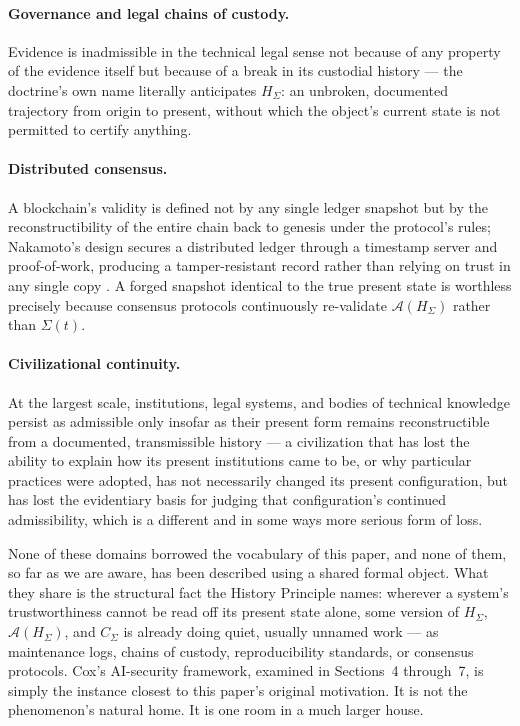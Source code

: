 \documentclass[11pt]{article}
\begin{document}
\paragraph{Governance and legal chains of custody.} Evidence is inadmissible in the technical legal sense not because of any property of the evidence itself but because of a break in its custodial history --- the doctrine's own name literally anticipates $H_\Sigma$: an unbroken, documented trajectory from origin to present, without which the object's current state is not permitted to certify anything.

\paragraph{Distributed consensus.} A blockchain's validity is defined not by any single ledger snapshot but by the reconstructibility of the entire chain back to genesis under the protocol's rules; Nakamoto's design secures a distributed ledger through a timestamp server and proof-of-work, producing a tamper-resistant record rather than relying on trust in any single copy \cite{nakamoto2008}. A forged snapshot identical to the true present state is worthless precisely because consensus protocols continuously re-validate $\mathcal{A}(H_\Sigma)$ rather than $\Sigma(t)$.

\paragraph{Civilizational continuity.} At the largest scale, institutions, legal systems, and bodies of technical knowledge persist as admissible only insofar as their present form remains reconstructible from a documented, transmissible history --- a civilization that has lost the ability to explain how its present institutions came to be, or why particular practices were adopted, has not necessarily changed its present configuration, but has lost the evidentiary basis for judging that configuration's continued admissibility, which is a different and in some ways more serious form of loss.

None of these domains borrowed the vocabulary of this paper, and none of them, so far as we are aware, has been described using a shared formal object. What they share is the structural fact the History Principle names: wherever a system's trustworthiness cannot be read off its present state alone, some version of $H_\Sigma$, $\mathcal{A}(H_\Sigma)$, and $C_\Sigma$ is already doing quiet, usually unnamed work --- as maintenance logs, chains of custody, reproducibility standards, or consensus protocols. Cox's AI-security framework, examined in Sections~4 through~7, is simply the instance closest to this paper's original motivation. It is not the phenomenon's natural home. It is one room in a much larger house.
\end{document}
